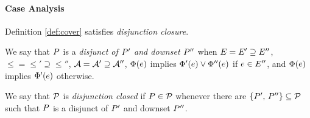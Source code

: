





\paragraph{Case Analysis}
Definition \ref{def:cover} satisfies \emph{disjunction closure}.
\begin{definition}
  \label{def:dis}
  We say that $P$ is a \emph{disjunct of $P'$ and downset $P''$} when
  $E=E' \supseteq E''$, %
  ${\le}={\le'}\supseteq{\le''}$,
  $\mathcal{A}=\mathcal{A}' \supseteq\mathcal{A}''$, 
  $\Phi(e)$ implies
  $\Phi'(e)\lor \Phi''(e)$ if $e\in E''$, and
  $\Phi(e)$ implies
  $\Phi'(e)$ otherwise.

  We say that $\mathcal{P}$ is \emph{disjunction closed} if
  $P\in\mathcal{P}$ whenever there are $\{P',\,P''\}\subseteq \mathcal{P}$
  such that $P$ is a disjunct of $P'$ and downset $P''$.
\end{definition}
